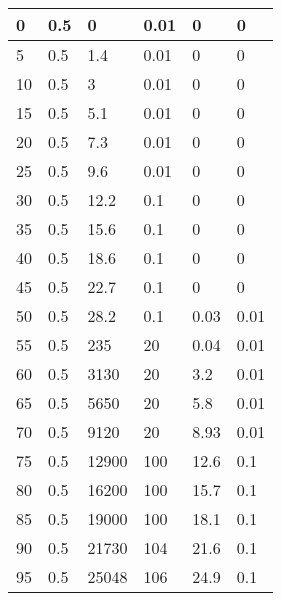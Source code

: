 \begin{center}
\begin{longtable}{|l|l|l|l|l|l|}
0      & 0.5     & 0                & 0.01         & 0              & 0          \\ \hline
5      & 0.5     & 1.4              & 0.01         & 0              & 0          \\ \hline
10     & 0.5     & 3                & 0.01         & 0              & 0          \\ \hline
15     & 0.5     & 5.1              & 0.01         & 0              & 0          \\ \hline
20     & 0.5     & 7.3              & 0.01         & 0              & 0          \\ \hline
25     & 0.5     & 9.6              & 0.01         & 0              & 0          \\ \hline
30     & 0.5     & 12.2             & 0.1          & 0              & 0          \\ \hline
35     & 0.5     & 15.6             & 0.1          & 0              & 0          \\ \hline
40     & 0.5     & 18.6             & 0.1          & 0              & 0          \\ \hline
45     & 0.5     & 22.7             & 0.1          & 0              & 0          \\ \hline
50     & 0.5     & 28.2             & 0.1          & 0.03           & 0.01       \\ \hline
55     & 0.5     & 235              & 20           & 0.04           & 0.01       \\ \hline
60     & 0.5     & 3130             & 20           & 3.2            & 0.01       \\ \hline
65     & 0.5     & 5650             & 20           & 5.8            & 0.01       \\ \hline
70     & 0.5     & 9120             & 20           & 8.93           & 0.01       \\ \hline
75     & 0.5     & 12900            & 100          & 12.6           & 0.1        \\ \hline
80     & 0.5     & 16200            & 100          & 15.7           & 0.1        \\ \hline
85     & 0.5     & 19000            & 100          & 18.1           & 0.1        \\ \hline
90     & 0.5     & 21730            & 104          & 21.6           & 0.1        \\ \hline
95     & 0.5     & 25048            & 106          & 24.9           & 0.1        \\ \hline

\end{longtable}
\end{center}

